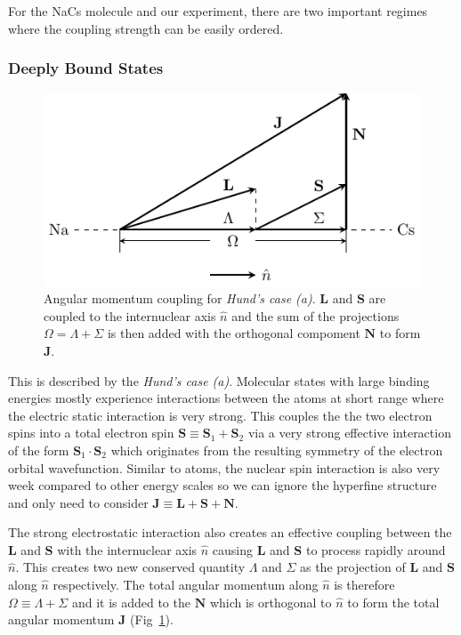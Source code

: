 For the NaCs molecule and our experiment, there are two important regimes where the coupling
strength can be easily ordered.

\subsubsection{Deeply Bound States}

\begin{figure}
  \centering
  \includegraphics[width=\textwidth]{figures/pa_hunds_case_a.pdf}
  \caption[Hund's case (a)]{
    Angular momentum coupling for \textit{Hund's case (a)}.
    $\mathbf{L}$ and $\mathbf{S}$ are coupled to the internuclear axis $\hat n$
    and the sum of the projections $\Omega=\Lambda+\Sigma$ is then
    added with the orthogonal compoment $\mathbf{N}$ to form $\mathbf{J}$.
    \label{fig:pa-hunds-case-a}}
\end{figure}

This is described by the \textit{Hund's case (a)}.
Molecular states with large binding energies mostly experience interactions
between the atoms at short range where the electric static interaction is very strong.
This couples the the two electron spins into a total electron spin
$\mathbf{S}\equiv\mathbf{S}_1+\mathbf{S}_2$ via a very strong effective interaction
of the form $\mathbf{S}_1\cdot\mathbf{S}_2$ which originates
from the resulting symmetry of the electron orbital wavefunction.
Similar to atoms, the nuclear spin interaction is also very week compared to
other energy scales so we can ignore the hyperfine structure and only need to consider
$\mathbf{J}\equiv\mathbf{L}+\mathbf{S}+\mathbf{N}$.

The strong electrostatic interaction also creates an effective coupling
between the $\mathbf{L}$ and $\mathbf{S}$ with the internuclear axis $\hat{n}$
causing $\mathbf{L}$ and $\mathbf{S}$ to process rapidly around $\hat{n}$.
This creates two new conserved quantity $\Lambda$ and $\Sigma$
as the projection of $\mathbf{L}$ and $\mathbf{S}$
along $\hat{n}$ respectively.
The total angular momentum along $\hat{n}$ is therefore $\Omega\equiv\Lambda+\Sigma$
and it is added to the $\mathbf{N}$ which is orthogonal to $\hat{n}$ to form
the total angular momentum $\mathbf{J}$ (Fig~\ref{fig:pa-hunds-case-a}).

